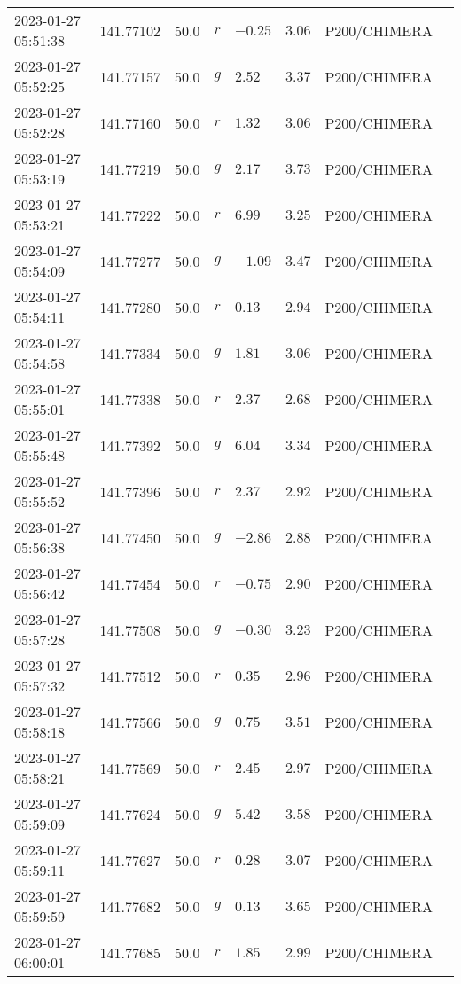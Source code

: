 \documentclass{nature_plusfigure}
\begin{document}
\begin{supplement}
\begin{center}
\begin{longtable}{llllllll}
2023-01-27 05:51:38 & 141.77102 & 50.0 & $r$ & $-0.25$ & $3.06$ & P200/CHIMERA &  \\ 
2023-01-27 05:52:25 & 141.77157 & 50.0 & $g$ & $2.52$ & $3.37$ & P200/CHIMERA &  \\ 
2023-01-27 05:52:28 & 141.77160 & 50.0 & $r$ & $1.32$ & $3.06$ & P200/CHIMERA &  \\ 
2023-01-27 05:53:19 & 141.77219 & 50.0 & $g$ & $2.17$ & $3.73$ & P200/CHIMERA &  \\ 
2023-01-27 05:53:21 & 141.77222 & 50.0 & $r$ & $6.99$ & $3.25$ & P200/CHIMERA &  \\ 
2023-01-27 05:54:09 & 141.77277 & 50.0 & $g$ & $-1.09$ & $3.47$ & P200/CHIMERA &  \\ 
2023-01-27 05:54:11 & 141.77280 & 50.0 & $r$ & $0.13$ & $2.94$ & P200/CHIMERA &  \\ 
2023-01-27 05:54:58 & 141.77334 & 50.0 & $g$ & $1.81$ & $3.06$ & P200/CHIMERA &  \\ 
2023-01-27 05:55:01 & 141.77338 & 50.0 & $r$ & $2.37$ & $2.68$ & P200/CHIMERA &  \\ 
2023-01-27 05:55:48 & 141.77392 & 50.0 & $g$ & $6.04$ & $3.34$ & P200/CHIMERA &  \\ 
2023-01-27 05:55:52 & 141.77396 & 50.0 & $r$ & $2.37$ & $2.92$ & P200/CHIMERA &  \\ 
2023-01-27 05:56:38 & 141.77450 & 50.0 & $g$ & $-2.86$ & $2.88$ & P200/CHIMERA &  \\ 
2023-01-27 05:56:42 & 141.77454 & 50.0 & $r$ & $-0.75$ & $2.90$ & P200/CHIMERA &  \\ 
2023-01-27 05:57:28 & 141.77508 & 50.0 & $g$ & $-0.30$ & $3.23$ & P200/CHIMERA &  \\ 
2023-01-27 05:57:32 & 141.77512 & 50.0 & $r$ & $0.35$ & $2.96$ & P200/CHIMERA &  \\ 
2023-01-27 05:58:18 & 141.77566 & 50.0 & $g$ & $0.75$ & $3.51$ & P200/CHIMERA &  \\ 
2023-01-27 05:58:21 & 141.77569 & 50.0 & $r$ & $2.45$ & $2.97$ & P200/CHIMERA &  \\ 
2023-01-27 05:59:09 & 141.77624 & 50.0 & $g$ & $5.42$ & $3.58$ & P200/CHIMERA &  \\ 
2023-01-27 05:59:11 & 141.77627 & 50.0 & $r$ & $0.28$ & $3.07$ & P200/CHIMERA &  \\ 
2023-01-27 05:59:59 & 141.77682 & 50.0 & $g$ & $0.13$ & $3.65$ & P200/CHIMERA &  \\ 
2023-01-27 06:00:01 & 141.77685 & 50.0 & $r$ & $1.85$ & $2.99$ & P200/CHIMERA &  \\ 

\end{longtable}
\end{center}
\end{supplement}
\end{document}
